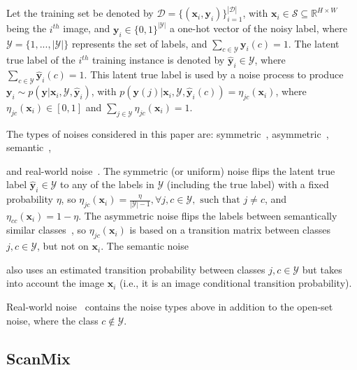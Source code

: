 \documentclass[review]{elsarticle}
\theoremstyle{plain}
\begin{document}
Let the training set be denoted by $\mathcal{D}=\{(\mathbf{x}_i, \mathbf{y}_i)\}_{i=1}^{|\mathcal{D}|}$, with $\mathbf{x}_i \in \mathcal{S} \subseteq \mathbb R^{H \times W}$ being the $i^{th}$ image, and $\mathbf{y}_i \in \{0,1\}^{|\mathcal{Y}|}$ a one-hot vector of the noisy label, where $\mathcal{Y} = \{1,...,|\mathcal{Y}|\}$ represents the  set of labels, and $\sum_{c \in \mathcal{Y}} \mathbf{y}_i(c)=1$. 
The latent true label of the $i^{th}$ training instance is denoted by $\hat{\mathbf{y}}_i \in \mathcal{Y}$, where $\sum_{c \in \mathcal{Y}} \hat{\mathbf{y}}_i(c)=1$.
This latent true label is used by a noise process to produce $\mathbf{y}_i \sim p(\mathbf{y} | \mathbf{x}_i,\mathcal{Y},\hat{\mathbf{y}}_i)$, with $p(\mathbf{y}(j) | \mathbf{x}_i,\mathcal{Y},\hat{\mathbf{y}}_i(c))=\eta_{jc}(\mathbf{x}_i)$,
where $\eta_{jc}(\mathbf{x}_i) \in [0,1]$ and $\sum_{j \in \mathcal{Y}}\eta_{jc}(\mathbf{x}_i)=1$.  

The types of noises considered in this paper are: symmetric~\citep{kim2019nlnl}, asymmetric~\citep{patrini2017making},  
semantic~\citep{rog}, 

and real-world noise~\citep{jiang2020beyond,li2017webvision,xiao2015learning}.
The symmetric (or uniform) noise flips the latent true label $\hat{\mathbf{y}}_i \in \mathcal{Y}$ to any of the labels in $\mathcal{Y}$ (including the true label) with a fixed probability $\eta$, so  $\eta_{jc}(\mathbf{x}_i)=\frac{\eta}{|\mathcal{Y}|-1}, \forall j,c \in \mathcal{Y}, \text{ such that } j \neq c$, and $\eta_{cc}(\mathbf{x}_i)=1-\eta$. 
The asymmetric noise flips the labels between semantically similar classes~\citep{patrini2017making}, so $\eta_{jc}(\mathbf{x}_i)$ is based on a transition matrix between classes $j,c\in\mathcal{Y}$, but not on $\mathbf{x}_i$. 
The semantic noise~\citep{rog} 

also uses an estimated transition probability between classes $j,c\in\mathcal{Y}$ but takes into account the image $\mathbf{x}_i$ (i.e., it is an image conditional transition probability).

Real-world noise~\citep{jiang2020beyond,li2017webvision,xiao2015learning} contains the noise types above in addition to the open-set noise, where the class $c\notin\mathcal{Y}$.



\subsection{ScanMix}
\label{sec:scanmix}
\end{document}
